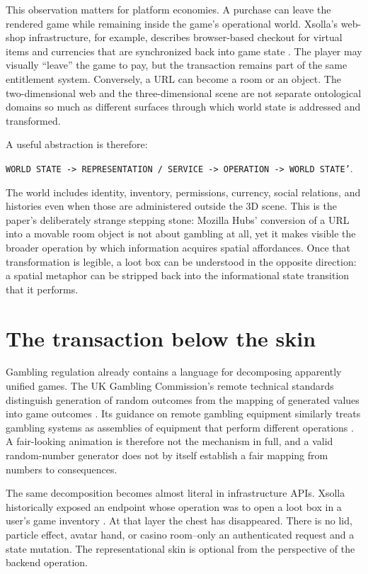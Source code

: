 \documentclass[11pt]{article}
\begin{document}
This observation matters for platform economies. A purchase can leave the rendered game while remaining inside the game's operational world. Xsolla's web-shop infrastructure, for example, describes browser-based checkout for virtual items and currencies that are synchronized back into game state \parencite{xsolla2025buybutton}. The player may visually ``leave'' the game to pay, but the transaction remains part of the same entitlement system. Conversely, a URL can become a room or an object. The two-dimensional web and the three-dimensional scene are not separate ontological domains so much as different surfaces through which world state is addressed and transformed.

A useful abstraction is therefore:
\begin{center}
\texttt{WORLD STATE -> REPRESENTATION / SERVICE -> OPERATION -> WORLD STATE'}.
\end{center}
The world includes identity, inventory, permissions, currency, social relations, and histories even when those are administered outside the 3D scene. This is the paper's deliberately strange stepping stone: Mozilla Hubs' conversion of a URL into a movable room object is not about gambling at all, yet it makes visible the broader operation by which information acquires spatial affordances. Once that transformation is legible, a loot box can be understood in the opposite direction: a spatial metaphor can be stripped back into the informational state transition that it performs.

\section{The transaction below the skin}
Gambling regulation already contains a language for decomposing apparently unified games. The UK Gambling Commission's remote technical standards distinguish generation of random outcomes from the mapping of generated values into game outcomes \parencite{ukgc_rts7_random_outcomes,ukgc_rts7_mapping}. Its guidance on remote gambling equipment similarly treats gambling systems as assemblies of equipment that perform different operations \parencite{ukgc_remote_gambling_equipment}. A fair-looking animation is therefore not the mechanism in full, and a valid random-number generator does not by itself establish a fair mapping from numbers to consequences.

The same decomposition becomes almost literal in infrastructure APIs. Xsolla historically exposed an endpoint whose operation was to open a loot box in a user's game inventory \parencite{xsolla_open_lootbox_api}. At that layer the chest has disappeared. There is no lid, particle effect, avatar hand, or casino room--only an authenticated request and a state mutation. The representational skin is optional from the perspective of the backend operation.
\end{document}

